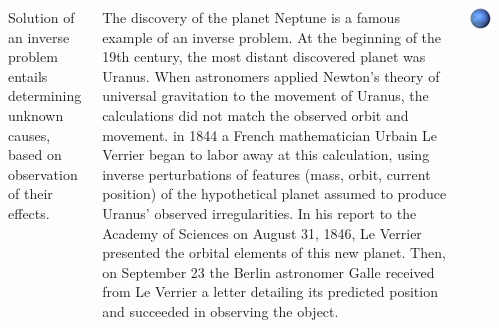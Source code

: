 \documentclass[a0paper,25pt]{tikzposter} %
\begin{document}
\begin{columns}
{\begin{tikzfigure}[]
\end{tikzfigure}


Solution of an inverse problem entails determining unknown causes, based on observation of their effects.

The discovery of the planet Neptune is a famous example of an inverse problem. At the beginning of the 19th century, the most distant discovered planet was Uranus. When astronomers applied Newton's theory of universal gravitation to the movement of Uranus, the calculations did not match the observed orbit and movement. in 1844 a French mathematician Urbain Le Verrier began to labor away at this calculation, using inverse perturbations of features (mass, orbit, current position) of the hypothetical planet assumed to produce Uranus' observed irregularities. In his report to the Academy of Sciences on August 31, 1846, Le Verrier presented the orbital elements of this new planet. Then, on September 23 the Berlin astronomer Galle received from Le Verrier a letter detailing its predicted position and succeeded in observing the object.

\begin{tikzfigure}[Neptune]
\includegraphics[scale=1]{Neptune.pdf}
\end{tikzfigure}

}
\end{columns}
\end{document}
